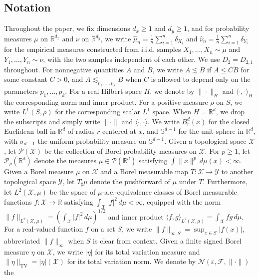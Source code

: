 \documentclass[11pt]{amsart}
\theoremstyle{definition}
\theoremstyle{remark}
\newcommand{\R}{\mathbb{R}}
\newcommand{\1}{\mathbf{1}}
\newcommand{\Sd}{\mathbb{S}}
\numberwithin{equation}{section}
\newcommand{\TV}{\mathrm{TV}}
\begin{document}
\subsection{Notation} Throughout the paper, we fix dimensions $d_x \geq 1$ and $d_y \geq 1$, and for
probability measures $\mu$ on $\R^{d_x}$ and $\nu$ on $\R^{d_y}$, we write
$\widehat\mu_n = \frac 1n \sum_{i=1}^n \delta_{X_i}$ and
$\widehat\nu_n = \frac 1n \sum_{i=1}^n \delta_{Y_i}$ for the empirical
measures constructed from i.i.d. samples $X_1,\ldots,X_n \sim \mu$ and
$Y_1,\ldots,Y_n \sim \nu$, with the two samples independent of each other. We use $D_2=D_{2,1}$ throughout. For nonnegative quantities $A$ and $B$, we write $A \lesssim B$ if
$A \le CB$ for some constant $C > 0$, and
$A \lesssim_{p_1,\ldots,p_k} B$ when $C$ is allowed to depend only on the
parameters $p_1,\ldots,p_k$. For a real Hilbert space $H$, we denote by $\|\cdot\|_H$ and
$\langle \cdot, \cdot \rangle_H$ the corresponding norm and inner product.
For a positive measure $\rho$ on $S$, we write $L^1(S,\rho)$ for the
corresponding scalar $L^1$ space.
When $H = \R^d$, we drop the subscripts and simply write $\|\cdot\|$ and
$\langle \cdot, \cdot \rangle$. We write $B^d_r(x)$ for the closed Euclidean
ball in $\R^d$ of radius $r$ centered at $x$, and $\Sd^{d-1}$ for the unit
sphere in $\R^d$, with $\sigma_{d-1}$ the uniform probability measure on
$\Sd^{d-1}$. Given a topological space $\mathcal{X}$, let
$\mathcal P(\mathcal X)$ be the collection of Borel probability measures on
$\mathcal{X}$. For $p\geq1$, let $\mathcal P_p(\R^d)$ denote the measures
$\mu\in\mathcal P(\R^d)$ satisfying $\int\|x\|^p\,d\mu(x)<\infty$. Given a Borel measure $\mu$ on $\mathcal{X}$ and a Borel
measurable map $T: \mathcal{X} \to \mathcal{Y}$ to another topological space
$\mathcal{Y}$, let $T_\sharp \mu$ denote the pushforward of $\mu$ under $T$.
Furthermore, let $L^2(\mathcal X,\mu)$ be the space of $\mu$-a.e.-equivalence
classes of Borel measurable functions $f:\mathcal X\to\R$ satisfying
$\int_{\mathcal X}|f|^2\,d\mu<\infty$, equipped with the norm
$\|f\|_{L^2(\mathcal X,\mu)}
=(\int_{\mathcal X}|f|^2\,d\mu)^{1/2}$ and inner product
$\langle f,g\rangle_{L^2(\mathcal X,\mu)}
=\int_{\mathcal X}fg\,d\mu$. For a real-valued function $f$ on a set $S$, we write
$\|f\|_{\infty,S} = \sup_{x \in S} |f(x)|$, abbreviated $\|f\|_\infty$ when
$S$ is clear from context. Given a
finite signed Borel measure $\eta$ on $\mathcal X$, we write $|\eta|$ for
its total variation measure and $\|\eta\|_{\TV} = |\eta|(\mathcal X)$ for its
total variation norm. We denote by
$\mathcal{N}(\varepsilon, \mathcal{F}, \|\cdot\|)$ the
\end{document}
